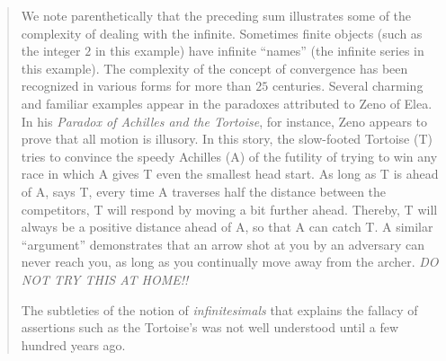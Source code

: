 \begin{quote}
We note parenthetically that the preceding sum illustrates some of the
complexity of dealing with the infinite.  Sometimes finite objects
(such as the integer $2$ in this example) have infinite ``names'' (the
infinite series in this example).  The complexity of the concept of
convergence has been recognized in various forms for more than $25$
centuries.  Several charming and familiar examples appear in the
paradoxes attributed to Zeno of Elea.  In his {\it Paradox of Achilles
  and the Tortoise}, for instance, Zeno appears to prove that all
motion is illusory.  In this story, the slow-footed Tortoise (T) tries
to convince the speedy Achilles (A) of the futility of trying to win
any race in which A gives T even the smallest head start.  As long as
T is ahead of A, says T, every time A traverses half the distance
between the competitors, T will respond by moving a bit further ahead.
Thereby, T will always be a positive distance ahead of A, so that A
can catch T.  A similar ``argument'' demonstrates that an arrow shot
at you by an adversary can never reach you, as long as you continually
move away from the archer.  {\em DO NOT TRY THIS AT HOME!!}

The subtleties of the notion of {\em infinitesimals} that explains the
fallacy of assertions such as the Tortoise's was not well understood
until a few hundred years ago.
\end{quote}


